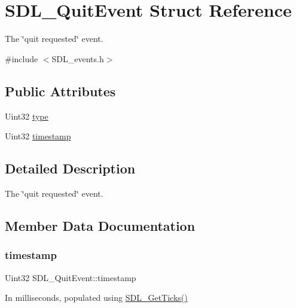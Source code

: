 \hypertarget{struct_s_d_l___quit_event}{}\section{S\+D\+L\+\_\+\+Quit\+Event Struct Reference}
\label{struct_s_d_l___quit_event}


The \char`\"{}quit requested\char`\"{} event.  




{\ttfamily \#include $<$S\+D\+L\+\_\+events.\+h$>$}

\subsection*{Public Attributes}
\begin{DoxyCompactItemize}
\item 
Uint32 \mbox{\hyperlink{struct_s_d_l___quit_event_a51ab0279e6de40249ba93971a8757cf0}{type}}
\item 
Uint32 \mbox{\hyperlink{struct_s_d_l___quit_event_a7acd4fa42ca96da8edac146baaa0b433}{timestamp}}
\end{DoxyCompactItemize}


\subsection{Detailed Description}
The \char`\"{}quit requested\char`\"{} event. 

\subsection{Member Data Documentation}
\mbox{\label{struct_s_d_l___quit_event_a7acd4fa42ca96da8edac146baaa0b433}} 
\subsubsection{\texorpdfstring{timestamp}{timestamp}}
{\footnotesize\ttfamily Uint32 S\+D\+L\+\_\+\+Quit\+Event\+::timestamp}

In milliseconds, populated using \mbox{\hyperlink{_s_d_l__timer_8h_a0b9bc71d6287e0ffafdc3419760fe2b3}{S\+D\+L\+\_\+\+Get\+Ticks()}} \mbox{\label{struct_s_d_l___quit_event_a51ab0279e6de40249ba93971a8757cf0}} 
